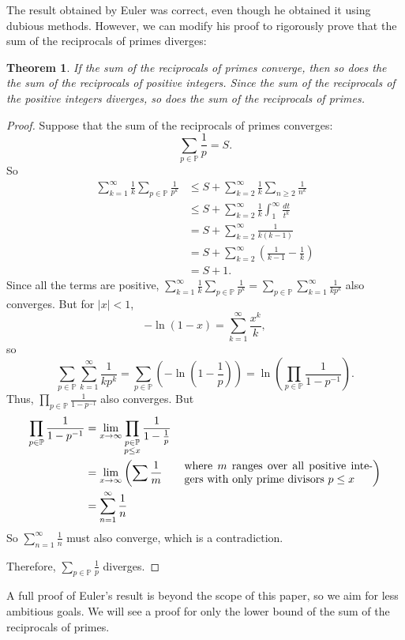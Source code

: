 \documentclass[a4paper]{article}
\newtheorem{theorem}{Theorem}[section]
\theoremstyle{definition}
\theoremstyle{remark}
\begin{document}
The result obtained by Euler was correct, even though he obtained it using dubious methods. However, we can modify his proof to rigorously prove that the sum of the reciprocals of primes diverges:
\begin{theorem}
  If the sum of the reciprocals of primes converge, then so does the the sum of the reciprocals of positive integers. Since the sum of the reciprocals of the positive integers diverges, so does the sum of the reciprocals of primes.
  \label{thm:reciprocalPrimeDiverge}
\end{theorem}
\begin{proof}
  Suppose that the sum of the reciprocals of primes converges:
  \[
  \sum_{p\in\mathbb{P}}\frac{1}{p}=S
  .
  \]
  So
  \begin{align*}
    \sum_{k=1}^\infty\frac{1}{k}\sum_{p\in\mathbb{P}}\frac{1}{p^k}&\le S + \sum_{k=2}^\infty\frac{1}{k}\sum_{n\ge2}\frac{1}{n^k}\\
    &\le S+\sum_{k=2}^\infty\frac{1}{k}\int_1^\infty\frac{dt}{t^k}\\
    &=S+\sum_{k=2}^\infty\frac{1}{k(k-1)}\\
    &=S+\sum_{k=2}^\infty\left( \frac{1}{k-1}-\frac{1}{k} \right)\\
    &=S+1
    .
  \end{align*}
  Since all the terms are positive, $\displaystyle\sum_{k=1}^\infty\frac{1}{k}\sum_{p\in\mathbb{P}}\frac{1}{p^k}=\sum_{p\in\mathbb{P}}\sum_{k=1}^\infty\frac{1}{kp^k}$ also converges. But for $|x|<1$, 
  \[
  -\ln(1-x)=\sum_{k=1}^\infty\frac{x^k}{k}
  ,
  \]
  so
  \[
  \sum_{p\in\mathbb{P}}\sum_{k=1}^\infty\frac{1}{kp^k}=\sum_{p\in\mathbb{P}}\left( -\ln\left( 1-\frac{1}{p} \right) \right)=\ln\left( \prod_{p\in\mathbb{P}}\frac{1}{1-p^{-1}} \right)
  .
  \]
  Thus, $\displaystyle\prod_{p\in\mathbb{P}}\frac{1}{1-p^{-1}}$ also converges. But
  \begin{align*}
    \prod_{p\in\mathbb{P}}\frac{1}{1-p^{-1}}&=\lim_{x\to\infty}\prod\limits_{\substack{p\in\mathbb{P}\\p\le x}}\frac{1}{1-\frac{1}{p}}\\
    &=\lim_{x\to\infty}\left( \sum\frac{1}{m}\qquad\parbox{6cm}{where $m$ ranges over all positive integers with only prime divisors $p\le x$} \right)\\
    &=\sum_{n=1}^\infty\frac{1}{n}
  \end{align*}
  So $\displaystyle\sum_{n=1}^\infty\frac{1}{n}$ must also converge, which is a contradiction.

  Therefore, $\displaystyle\sum_{p\in\mathbb{P}}\frac{1}{p}$ diverges.
\end{proof}
A full proof of Euler's result is beyond the scope of this paper, so we aim for less ambitious goals. We will see a proof for only the lower bound of the sum of the reciprocals of primes.
\end{document}

